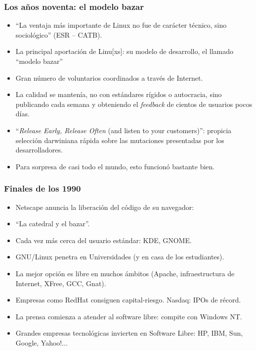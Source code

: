 \documentclass{beamer}
\begin{document}

\begin{frame}
\frametitle{Los años noventa: el modelo bazar}


\begin{itemize}

\item ``La ventaja más importante de Linux no fue de carácter técnico, sino sociológico'' (ESR -- CATB).
\item {La principal aportación de Linu[xs]: su modelo de desarrollo, el llamado ``modelo bazar''}
\item Gran número de voluntarios coordinados a través de Internet. 
\item La calidad se mantenía, no con estándares rígidos o autocracia, sino publicando cada semana y obteniendo el \textit{feedback} de cientos de usuarios pocos días.
\item ``\textit{Release Early, Release Often} (and listen to your customers)'': propicia selección darwiniana rápida sobre las mutaciones presentadas por los desarrolladores. 
\item Para sorpresa de casi todo el mundo, esto funcionó bastante bien. 
\end{itemize}

\end{frame}




\begin{frame}
\frametitle{Finales de los 1990}

\begin{itemize}
\item Netscape anuncia la liberación del código de su navegador: 
\item ``La catedral y el bazar''.
\item Cada vez más cerca del usuario estándar: KDE, GNOME.
\item GNU/Linux penetra en Universidades (y en casa de los
estudiantes).
\item La mejor opción es libre en muchos ámbitos (Apache, infraestructura de Internet, XFree, GCC, Gnat).
\item Empresas como RedHat consiguen capital-riesgo. Nasdaq: IPOs de récord.
\item La prensa comienza a atender al software libre: compite con Windows NT.
\item Grandes empresas tecnológicas invierten en Software Libre: HP, IBM, Sun, Google, Yahoo!...
\end{itemize}

\end{frame}
\end{document}

